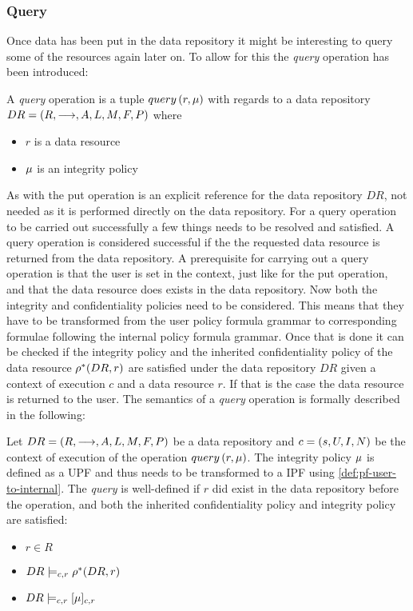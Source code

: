 \subsubsection{Query}\label{sec:query}
Once data has been put in the data repository it might be interesting to query some of the resources again later on. To allow for this the \emph{query} operation has been introduced:
\begin{definition}
A \emph{query} operation is a tuple $query \left( r, \mu \right)$ with regards to a data repository $DR= \left( R, \longrightarrow, A, L, M, F, P \right)$ where
\begin{itemize}
  \item $r$ is a data resource
  \item $\mu$ is an integrity policy
\end{itemize}
\end{definition}
As with the put operation is an explicit reference for the data repository $DR$, not needed as it is performed directly on the data repository. For a query operation to be carried out successfully a few things needs to be resolved and satisfied. A query operation is considered successful if the the requested data resource is returned from the data repository. A prerequisite for carrying out a query operation is that the user is set in the context, just like for the put operation, and that the data resource does exists in the data repository. Now both the integrity and confidentiality policies need to be considered. This means that they have to be transformed from the user policy formula grammar to corresponding formulae following the internal policy formula grammar. Once that is done it can be checked if the integrity policy and the inherited confidentiality policy of the data resource $\rho^{\ast}(DR,r)$ are satisfied under the data repository $DR$ given a context of execution $c$ and a data resource $r$. If that is the case the data resource is returned to the user.
The semantics of a \emph{query} operation is formally described in the following:
\begin{definition}
Let $DR= \left( R, \longrightarrow, A, L, M, F, P \right)$ be a data repository and $c = \left( s, U, I, N \right)$ be the context of execution of the operation $query \left( r, \mu \right)$. The integrity policy $\mu$ is defined as a UPF and thus needs to be transformed to a IPF using \autoref{def:pf-user-to-internal}.
The \emph{query} is well-defined if $r$ did exist in the data repository before the operation, and both the inherited confidentiality policy and integrity policy are satisfied:
\begin{itemize}
    \item $r \in R$
    \item $DR \models_{c,r} \rho^{\ast}(DR, r)$
    \item $DR \models_{c,r} [\mu]_{c,r}$
\end{itemize}
\end{definition}

